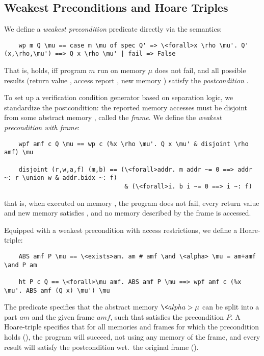 \documentclass[a4paper,UKenglish,cleveref, autoref, thm-restate]{lipics-v2021}
\begin{document}
  \subsection{Weakest Preconditions and Hoare Triples}\label{sec:wp_hoare}
  We define a \emph{weakest precondition} predicate directly via the semantics:
  \begin{lstlisting}
    wp m Q \mu == case m \mu of spec Q' => \<forall>x \rho \mu'. Q' (x,\rho,\mu') ==> Q x \rho \mu' | fail => False
  \end{lstlisting}
  That is,  holds, iff program \is$m$ run on memory \is$\mu$ does not fail, and all possible results (return value , access report \is{\rho}, new memory )
  satisfy the \emph{postcondition} .

  To set up a verification condition generator based on separation logic,
  we standardize the postcondition: the reported memory accesses must be disjoint
  from some abstract memory , called the \emph{frame}. We define the
  \emph{weakest precondition with frame}:
  \begin{lstlisting}
    wpf amf c Q \mu == wp c (%x \rho \mu'. Q x \mu' & disjoint \rho amf) \mu

    disjoint (r,w,a,f) (m,b) == (\<forall>addr. m addr ~= 0 ==> addr ~: r \union w & addr.bidx ~: f)
                                 & (\<forall>i. b i ~= 0 ==> i ~: f)
  \end{lstlisting}
  that is, when executed on memory \is{\mu}, the program  does not fail, every return value  and new memory  satisfies ,
  and no memory described by the frame  is accessed.

  Equipped with a weakest precondition with access restrictions, we define a Hoare-triple:
  \begin{lstlisting}
    ABS amf P \mu == \<exists>am. am # amf \and \<alpha> \mu = am+amf \and P am

    ht P c Q == \<forall>\mu amf. ABS amf P \mu ==> wpf amf c (%x \mu'. ABS amf (Q x) \mu') \mu
  \end{lstlisting}
  The predicate  specifies that the abstract memory \is$\<alpha> \mu$ can be
  split into a part \is$am$ and the given frame \is$amf$, such that  satisfies the precondition $P$.
  A Hoare-triple  specifies that for all memories and frames
  for which the precondition holds (), the program will succeed,
  not using any memory of the frame, and every result will satisfy the postcondition
  wrt.\ the original frame ().
\end{document}
